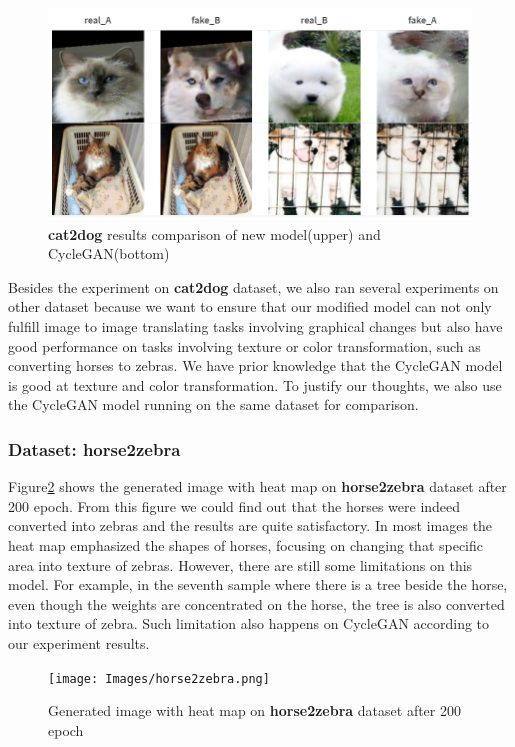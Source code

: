 \documentclass{article}
\begin{document}
\begin{figure}
\centerline{\includegraphics[width=1\columnwidth]{Images/compare.png}}\caption{\textbf{cat2dog} results comparison of new model(upper) and CycleGAN(bottom)}
\label{fig:cat2dog}
\end{figure} 

Besides the experiment on \textbf{cat2dog} dataset,  we also ran several experiments on other dataset because we want to ensure that our modified model can not only fulfill image to image translating tasks involving graphical changes but also have good performance on tasks involving texture or color transformation, such as converting horses to zebras. We have prior knowledge that the CycleGAN model is good at texture and color transformation. To justify our thoughts, we also use the CycleGAN model running on the same dataset for comparison. 

\subsubsection{Dataset: \textbf{horse2zebra}}

Figure\ref{fig:horse2zebra} shows the generated image with heat map on \textbf{horse2zebra} dataset after 200 epoch. From this figure we could find out that the horses were indeed converted into zebras and the results are quite satisfactory. In most images the heat map emphasized the shapes of horses, focusing on changing that specific area into texture of zebras. However, there are still some limitations on this model. For example, in the seventh sample where there is a tree beside the horse, even though the weights are concentrated on the horse, the tree is also converted into texture of zebra. Such limitation also happens on CycleGAN according to our experiment results. 


\begin{figure}
\centerline{\texttt{[image: Images/horse2zebra.png]}}\caption{Generated image with heat map on \textbf{horse2zebra} dataset after 200 epoch}
\label{fig:horse2zebra}
\end{figure} 
\end{document}

